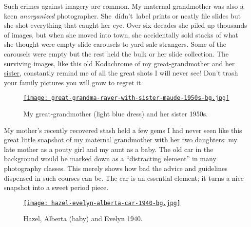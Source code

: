 Such crimes against imagery are common. My maternal grandmother was also
a keen \emph{unorganized} photographer. She~didn't~label prints or
neatly file slides but she shot everything that caught her eye. Over six
decades she piled up thousands of images, but when she moved into town,
she accidentally sold stacks of what she thought were empty slide
carousels to yard sale strangers. Some of the carousels were empty but
the rest held the bulk or her slide collection. The surviving images,
like this \hyperlink{ht:4048X1}{old Kodachrome of my great-grandmother and her sister},
constantly remind me of all the great shots I will never see! Don't
trash your family pictures you will grow to regret it.


\begin{figure}[htbp]
\centering
\hypertarget{ht:4048X1}{}
\href{http://conceptcontrol.smugmug.com/People/From-Hazels-Albums-1/7104752\_FZK4j4\#!i=475252263\&k=s7FVxLV\&lb=1\&s=A}{\texttt{[image: great-grandma-raver-with-sister-maude-1950s-bg.jpg]}}
\caption{My great-grandmother (light blue dress) and her sister 1950s.}
\label{fig:4048X1}
\end{figure}

My mother's recently recovered stash held a few gems I had never seen
like this \hyperlink{ht:4048X2}{great little snapshot of my maternal grandmother with her two
daughters}: my late mother as a pouty girl and my aunt as a baby. The old
car in the background would be marked down as a ``distracting element''
in many photography classes. This merely shows how bad the advice and
guidelines dispensed in such courses can be. The car is an essential
element; it turns a nice snapshot into a sweet period piece.


\begin{figure}[htbp]
\centering
\hypertarget{ht:4048X2}{}
\href{http://conceptcontrol.smugmug.com/People/From-Hazels-Albums-1/7104752\_FZK4j4\#!i=2524884643\&k=WcQmrR4\&lb=1\&s=A}{\texttt{[image: hazel-evelyn-alberta-car-1940-bg.jpg]}}
\caption{Hazel, Alberta (baby) and Evelyn 1940.}
\label{fig:4048X2}
\end{figure}

